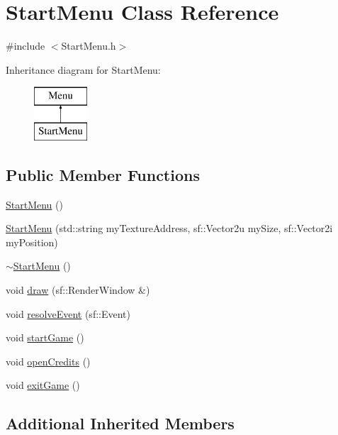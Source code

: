 \hypertarget{class_start_menu}{\section{Start\+Menu Class Reference}
\label{class_start_menu}
}


{\ttfamily \#include $<$Start\+Menu.\+h$>$}

Inheritance diagram for Start\+Menu\+:\begin{figure}[H]
\begin{center}
\leavevmode
\includegraphics[height=2.000000cm]{class_start_menu}
\end{center}
\end{figure}
\subsection*{Public Member Functions}
\begin{DoxyCompactItemize}
\item 
\hyperlink{class_start_menu_aee52e6dee72aae9ebf1a502f3eaeb4f1}{Start\+Menu} ()
\item 
\hyperlink{class_start_menu_aeb41c71dcfa43b3e9a88c256fc261d99}{Start\+Menu} (std\+::string my\+Texture\+Address, sf\+::\+Vector2u my\+Size, sf\+::\+Vector2i my\+Position)
\item 
\hyperlink{class_start_menu_a0586b30fd5cedbb22ad3a22c98913481}{$\sim$\+Start\+Menu} ()
\item 
void \hyperlink{class_start_menu_a34e56fc211d852a717bef5fc4136d13e}{draw} (sf\+::\+Render\+Window \&)
\item 
void \hyperlink{class_start_menu_a4f6701a9d7a4e08a5212c675ef1c66b2}{resolve\+Event} (sf\+::\+Event)
\item 
void \hyperlink{class_start_menu_a40316866dabe852ee5c931eb5fde164e}{start\+Game} ()
\item 
void \hyperlink{class_start_menu_ab350bdd6779e99bda9f1f4aaa5f02977}{open\+Credits} ()
\item 
void \hyperlink{class_start_menu_a13b4a44809a8c76af1ccfeb97a4d86b5}{exit\+Game} ()
\end{DoxyCompactItemize}
\subsection*{Additional Inherited Members}


